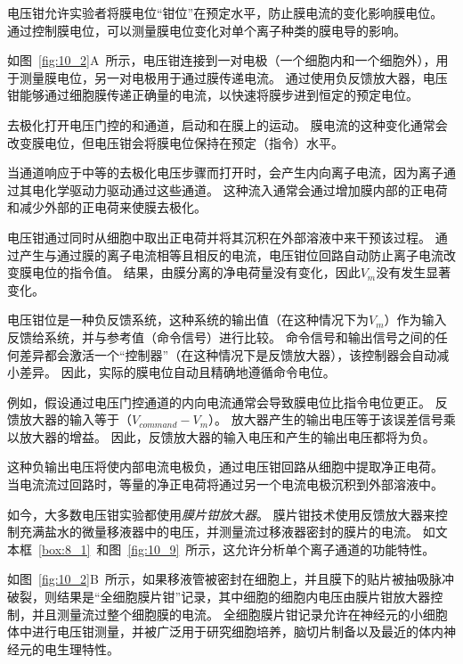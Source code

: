 \begin{proposition}[电压钳技术] \label{box:10_1}
	
	\quad \quad 电压钳允许实验者将膜电位“钳位”在预定水平，防止膜电流的变化影响膜电位。
	通过控制膜电位，可以测量膜电位变化对单个离子种类的膜电导的影响。
	
	\quad \quad 如图~\ref{fig:10_2}A~所示，电压钳连接到一对电极（一个细胞内和一个细胞外），用于测量膜电位，另一对电极用于通过膜传递电流。
	通过使用负反馈放大器，电压钳能够通过细胞膜传递正确量的电流，以快速将膜步进到恒定的预定电位。
	
	\quad \quad 去极化打开电压门控的和通道，启动和在膜上的运动。
	膜电流的这种变化通常会改变膜电位，但电压钳会将膜电位保持在预定（指令）水平。
	
	\quad \quad 当通道响应于中等的去极化电压步骤而打开时，会产生内向离子电流，因为离子通过其电化学驱动力驱动通过这些通道。
	这种流入通常会通过增加膜内部的正电荷和减少外部的正电荷来使膜去极化。
	
	\quad \quad 电压钳通过同时从细胞中取出正电荷并将其沉积在外部溶液中来干预该过程。
	通过产生与通过膜的离子电流相等且相反的电流，电压钳位回路自动防止离子电流改变膜电位的指令值。
	结果，由膜分离的净电荷量没有变化，因此$V_m$没有发生显著变化。
	
	\quad \quad 电压钳位是一种负反馈系统，这种系统的输出值（在这种情况下为$V_m$）作为输入反馈给系统，并与参考值（命令信号）进行比较。
	命令信号和输出信号之间的任何差异都会激活一个“控制器”（在这种情况下是反馈放大器），该控制器会自动减小差异。
	因此，实际的膜电位自动且精确地遵循命令电位。
	
	\quad \quad 例如，假设通过电压门控通道的内向电流通常会导致膜电位比指令电位更正。
	反馈放大器的输入等于（$V_{command}-V_m$）。
	放大器产生的输出电压等于该误差信号乘以放大器的增益。
	因此，反馈放大器的输入电压和产生的输出电压都将为负。
	
	\quad \quad 这种负输出电压将使内部电流电极负，通过电压钳回路从细胞中提取净正电荷。
	当电流流过回路时，等量的净正电荷将通过另一个电流电极沉积到外部溶液中。
	
	\quad \quad 如今，大多数电压钳实验都使用\textit{膜片钳放大器}。
	膜片钳技术使用反馈放大器来控制充满盐水的微量移液器中的电压，并测量流过移液器密封的膜片的电流。
	如文本框~\ref{box:8_1}~和图~\ref{fig:10_9}~所示，这允许分析单个离子通道的功能特性。
	
	\quad \quad 如图~\ref{fig:10_2}B~所示，如果移液管被密封在细胞上，并且膜下的贴片被抽吸脉冲破裂，则结果是“全细胞膜片钳”记录，其中细胞的细胞内电压由膜片钳放大器控制，并且测量流过整个细胞膜的电流。
	全细胞膜片钳记录允许在神经元的小细胞体中进行电压钳测量，并被广泛用于研究细胞培养，脑切片制备以及最近的体内神经元的电生理特性。
	
\end{proposition}



